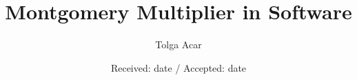 \documentclass[twocolumn]{svjour3}          %
\begin{document}
\title{Montgomery Multiplier in Software%
}


\author{Tolga Acar}



\date{Received: date / Accepted: date }


\maketitle

\def\bfor{\bf for\hspace{1ex}}
\def\bto{\hspace{1ex}\bf to\hspace{1ex}}
\def\bif{\bf if\hspace{1ex}}
\def\bthen{\hspace{1ex}\bf then\hspace{1ex}}
\def\belse{\bf else\hspace{1ex}}
\def\bret{\bf ret\hspace{1ex}}

\newcommand{\mon}{\mbox{MonPro}}
\newcommand{\mwbox}[1]{\mbox{\hspace*{1ex}\mbox{#1}\hspace*{1em}}}
\newcommand{\eqref}[1]{\mbox{(\ref{#1})}}
\end{document}
